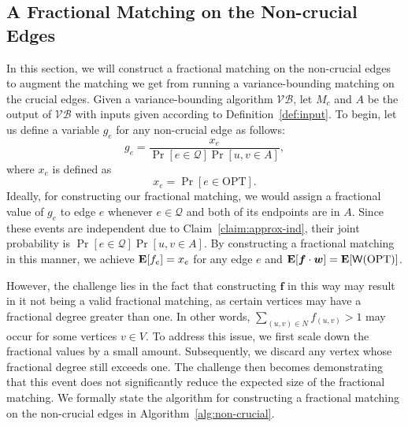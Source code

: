 \documentclass[letterpaper,11pt]{article}
\DeclareMathOperator{\E}{\ensuremath{\normalfont \textbf{E}}}
\newcommand{\mc}[1]{\ensuremath{\mathcal{#1}}}
\newcommand{\opt}[0]{\text{OPT}}
\newcommand{\weight}[0]{{\sf{W}}}
\newcommand{\VB}[0]{\ensuremath{\mathcal{VB}}}
\renewcommand{\mc}[1]{\ensuremath{\mathcal{#1}}}
\begin{document}
\subsection{A Fractional Matching on the Non-crucial Edges}\label{sec:sec_five}
In this section, we will construct a fractional matching on the non-crucial edges to augment the matching  we get from running a variance-bounding matching on the crucial edges.
Given a variance-bounding algorithm \VB, let $M_c$ and $A$ be the output of $\VB$ with inputs given according to Definition~\ref{def:input}. To begin, let us define a variable $g_e$ for any non-crucial edge as follows:
\begin{equation}
g_e= \frac{x_e}{\Pr[e\in \mc{Q}]\Pr[{u,v}\in A]},
\end{equation}
where $x_e$ is defined as $$x_e= \Pr[e\in \opt].$$ Ideally, for constructing our fractional matching, we would assign a fractional value of $g_e$ to edge $e$ whenever $e\in \mc{Q}$ and both of its endpoints are in $A$. Since these events are independent due to Claim~\ref{claim:approx-ind}, their joint probability is $\Pr[e\in \mc{Q}]\Pr[{u,v}\in A]$. By constructing a fractional matching in this manner, we achieve $\E[f_e]=x_e$ for any edge $e$ and $\E[\bm{f}\cdot\bm{w}] = \E[\weight(\opt)]$. 


However, the challenge lies in the fact that constructing $\bm{f}$ in this way may result in it not being a valid fractional matching, as certain vertices may have a fractional degree greater than one. In other words, $\sum_{(u,v)\in N} f_{(u,v)} >1$ may occur for some vertices $v\in V$. To address this issue, we first scale down the fractional values by a small amount. Subsequently, we discard any vertex whose fractional degree still exceeds one. The challenge then becomes demonstrating that this event does not significantly reduce the expected size of the fractional matching. We formally state the algorithm for constructing  a fractional matching on the non-crucial edges in Algorithm~\ref{alg:non-crucial}.
\end{document}
